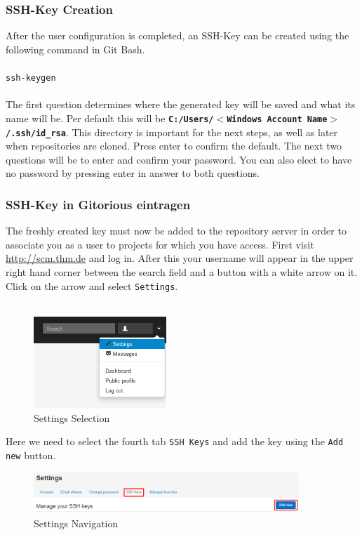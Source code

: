 \documentclass[]{report}
\begin{document}
\subsubsection{SSH-Key Creation}

After the user configuration is completed, an SSH-Key can be created using the following command in Git Bash.\\
\\ 
\texttt{ssh-keygen}\\
\\
The first question determines where the generated key will be saved and what its name will be. Per default this will be \textbf{\texttt{C:/Users/$<$Windows Account Name$>$/.ssh/id\_rsa}}. This directory is important for the next steps, as well as later when repositories are cloned. Press enter to confirm the default.
The next two questions will be to enter and confirm your password. You can also elect to have no password by pressing enter in answer to both questions.

\subsubsection{SSH-Key in Gitorious eintragen}

The freshly created key must now be added to the repository server in order to associate you as a user to projects for which you have access. First visit \url{http://scm.thm.de} and log in. After this your username will appear in the upper right hand corner between the search field and a button with a white arrow on it. Click on the arrow and select \texttt{Settings}.\\
\\
\begin{figure}[h] 
  \centering
     \includegraphics[width=5cm]{gitorious1.jpg}
  \caption{Settings Selection}
\end{figure}

\noindent
Here we need to select the fourth tab \texttt{SSH Keys} and add the key using the \texttt{Add new} button.\\

\begin{figure}[h] 
  \centering
     \includegraphics[width=10cm]{gitsettings.png}
  \caption{Settings Navigation}
\end{figure}
\end{document}
